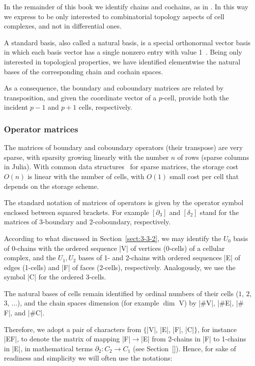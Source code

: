 {In the remainder of this book we identify chains  and cochains, as in \cite{PAOLUZZI2023103436}.
In this way we express to be only interested to combinatorial topology aspects of cell complexes, and not in differential ones. 

A standard basis, also called a natural basis, is a special orthonormal vector basis in which each basis vector has a single nonzero entry with value 1~\cite{Wolfram:algebra:StandardBasis}.
Being only interested in topological properties, we have identified elementwise the natural bases of the corresponding chain and cochain spaces. 

As a consequence, the boundary and coboundary matrices are related by transposition, and given the coordinate vector of a $p$-cell, provide both the incident $p-1$ and $p+1$ cells, respectively.



\subsubsection*{Operator matrices}

The matrices of boundary and coboundary operators (their transpose) are very
sparse, with sparsity growing linearly with the number $n$ of rows (sparse columns in Julia).  With common data structures~\cite{coosparse} for sparse matrices, 
the storage cost $O(n)$ is linear with the number of cells, with $O(1)$ small cost per cell  that depends on the storage scheme.
\begin{remark}
The standard notation of matrices of operators is given by the operator symbol enclosed between squared brackets. For example $[\partial_3]$ and $[\delta_2]$ stand for the matrices of 3-boundary and 2-coboundary, respectively.\\
\begin{end}

According to what discussed in Section~\ref{sect:3-3-2}, we may identify the $U_0$ basis of 0-chains with the ordered sequence |V| of vertices (0-cells) of a cellular complex, and the $U_1, U_2$ bases of 1- and 2-chains with ordered sequences |E| of edges (1-cells) and |F| of faces (2-cells), respectively. Analogously, we use the symbol |C| for the ordered 3-cells. 

The natural bases of cells remain identified by ordinal numbers of their cells ($1$, $2$, $3$, $\ldots$), and the chain spaces dimension (for example $\dim$ V) by |$\#$V|, |$\#$E|, |$\#$F|, and |$\#$C|.

Therefore, we adopt a pair of characters from $\{$|V|, |E|, |F|, |C|$\}$, for instance |EF|, to denote the matrix of mapping |F|${}\to{}$|E| from 2-chains in |F| to 1-chains in |E|,  in mathematical terms $\partial_2 : C_2 \to C_1$ (see Section~\ref{}).
Hence, for sake of readiness and simplicity we will often use the notations:


\end{end}
\end{remark}}
